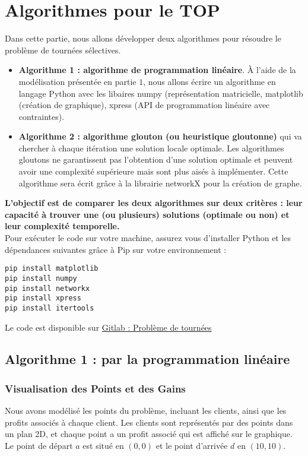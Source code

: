 \documentclass[a4paper, 12pt, DIV=12]{scrartcl}
\begin{document}
\section{Algorithmes pour le TOP}
Dans cette partie, nous allons développer deux algorithmes pour résoudre le problème de tournées sélectives.
\begin{itemize}
    \item \textbf{Algorithme 1 : algorithme de programmation linéaire}. À l'aide de la modélisation présentée en partie $1$, nous allons écrire un algorithme en langage Python avec les libaires numpy (représentation matricielle, matplotlib (création de graphique), xpress (API de programmation linéaire avec contraintes).
    \item \textbf{Algorithme 2 : algorithme glouton (ou heuristique gloutonne)} qui va chercher à chaque itération une solution locale optimale. Les algorithmes gloutons ne garantissent pas l'obtention d'une solution optimale et peuvent avoir une complexité supérieure mais sont plus aisés à implémenter. Cette algorithme sera écrit grâce à la librairie networkX pour la création de graphe. 
\\[10pt]    
\end{itemize}
\textbf{L'objectif est de comparer les deux algorithmes sur deux critères : leur capacité à trouver une (ou plusieurs) solutions (optimale ou non) et leur complexité temporelle.}\\[3pt]
Pour exécuter le code sur votre machine, assurez vous d'installer Python et les dépendances suivantes grâce à Pip sur votre environnement : 
\begin{verbatim}
pip install matplotlib 
pip install numpy
pip install networkx
pip install xpress
pip install itertools
\end{verbatim}
Le code est disponible sur \href{https://gitlab.utc.fr/qvalakou/ai09_tournees}{Gitlab : Problème de tournées}

\newpage
\subsection{Algorithme 1 : par la programmation linéaire}
\subsubsection{Visualisation des Points et des Gains}

Nous avons modélisé les points du problème, incluant les clients, ainsi que les profits associés à chaque client. Les clients sont représentés par des points dans un plan 2D, et chaque point a un profit associé qui est affiché sur le graphique. Le point de départ \( a \) est situé en \( (0, 0) \) et le point d'arrivée \( d \) en \( (10, 10) \).
\end{document}
